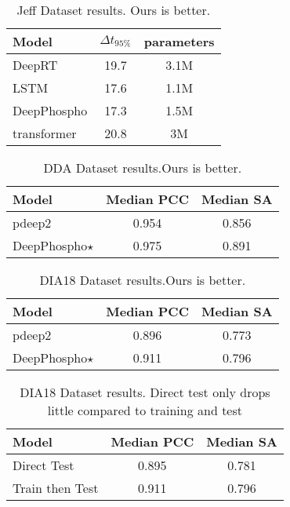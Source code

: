    \begin{table}
      \begin{center}
      \begin{tabular}{|l|c|c|}
      \hline
      Model & $\Delta$$t_{95\%}$ & parameters \\
      \hline\hline
      DeepRT & 19.7 & 3.1M \\
      LSTM & 17.6 & 1.1M \\
      DeepPhospho & 17.3 & 1.5M \\
      transformer & 20.8 & 3M \\
      \hline
      \end{tabular}
      \end{center}
      \caption{Jeff Dataset results.   Ours is better.}
      \label{table:Jeff}
      \end{table}

\begin{table}
   \begin{center}
   \begin{tabular}{|l|c|c|}
   \hline
   Model & Median PCC & Median SA \\
   \hline\hline
   pdeep2 & 0.954 & 0.856 \\
   DeepPhospho$\star$ & 0.975 & 0.891 \\
   \hline
   \end{tabular}
   \end{center}
   \caption{DDA Dataset results.Ours is better.}
   \label{table:DDA}
   \end{table}

\begin{table}
   \begin{center}
   \begin{tabular}{|l|c|c|}
   \hline
   Model & Median PCC & Median SA \\
   \hline\hline
   pdeep2 & 0.896 & 0.773 \\
   DeepPhospho$\star$ & 0.911 & 0.796 \\
   \hline
   \end{tabular}
   \end{center}
   \caption{DIA18 Dataset results.Ours is better.}
   \label{table:DIA18}
\end{table}

\begin{table}
   \begin{center}
   \begin{tabular}{|l|c|c|}
   \hline
   Model & Median PCC & Median SA \\
   \hline\hline
   Direct Test & 0.895 & 0.781 \\
   Train then Test & 0.911 & 0.796 \\
   \hline
   \end{tabular}
   \end{center}
   \caption{DIA18 Dataset results. Direct test only drops little compared to training and test}
   \label{table:DIA18_direct}
\end{table}
